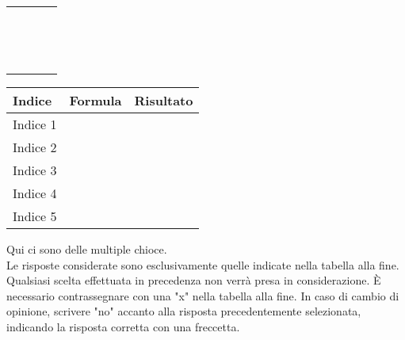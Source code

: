 \documentclass{book}
\begin{document}
\begin{longtable}{|m{6cm}|m{0.5cm}|m{6cm}|m{0.5cm}|}
    \hline
    & & & \\
    \hline
    & & & \\
    \hline
    & & & \\
    \hline
    & & & \\
    \hline
    & & & \\
    \hline
    & & & \\
    \hline
    & & & \\
    \hline
    & & & \\
    \hline
    & & & \\
    \hline
    & & & \\
    \hline
    & & & \\
    \hline
    & & & \\
    \hline
    & & & \\
    \hline
    & & & \\
    \hline
    & & & \\
    \hline
\end{longtable}
\label{tab:Stato Patrimoniale}
\raggedright
\setlength{\extrarowheight}{10pt} %
\begin{tabular}{|m{3cm}|m{6cm}|m{3cm}|}
\hline
Indice & Formula & Risultato \\
\hline
Indice 1 & &\\
\hline
Indice 2 & &\\
\hline
Indice 3 & &\\
\hline
Indice 4 & &\\
\hline
Indice 5 & &\\
\hline
\end{tabular}
\newpage
\setlength{\extrarowheight}{1pt} %
Qui ci sono delle multiple chioce.\\
Le risposte considerate sono esclusivamente quelle indicate nella tabella alla fine. Qualsiasi scelta effettuata in precedenza non verrà presa in considerazione. È necessario contrassegnare con una "x" nella tabella alla fine. In caso di cambio di opinione, scrivere "no" accanto alla risposta precedentemente selezionata, indicando la risposta corretta con una freccetta.\\
\end{document}
